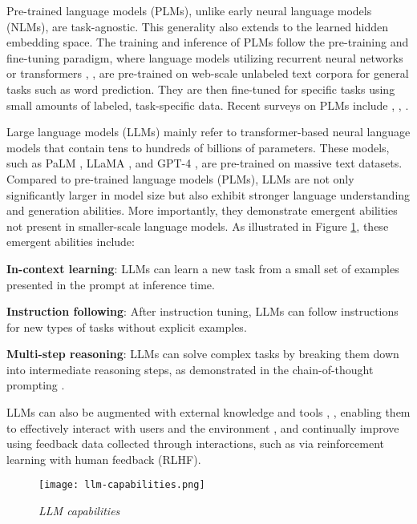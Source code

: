 Pre-trained language models (PLMs), unlike early neural language models (NLMs), are task-agnostic. This generality also extends to the learned hidden embedding space. The training and inference of PLMs follow the pre-training and fine-tuning paradigm, where language models utilizing recurrent neural networks \cite{peters2018deep} or transformers \cite{devlin2019bert}, \cite{liu2019roberta}, \cite{he2021deberta} are pre-trained on web-scale unlabeled text corpora for general tasks such as word prediction. They are then fine-tuned for specific tasks using small amounts of labeled, task-specific data. Recent surveys on PLMs include \cite{zhou2023comprehensive}, \cite{han2021pretrained}, \cite{Qiu_2020}.

Large language models (LLMs) mainly refer to transformer-based neural language models that contain tens to hundreds of billions of parameters. These models, such as PaLM \cite{chowdhery2022palm}, LLaMA \cite{touvron2023llama}, and GPT-4 \cite{openai2024gpt4}, are pre-trained on massive text datasets. Compared to pre-trained language models (PLMs), LLMs are not only significantly larger in model size but also exhibit stronger language understanding and generation abilities. More importantly, they demonstrate emergent abilities not present in smaller-scale language models. As illustrated in Figure \ref{fig:llm-capabilities}, these emergent abilities include:

\textbf{In-context learning}: LLMs can learn a new task from a small set of examples presented in the prompt at inference time.

\textbf{Instruction following}: After instruction tuning, LLMs can follow instructions for new types of tasks without explicit examples.

\textbf{Multi-step reasoning}: LLMs can solve complex tasks by breaking them down into intermediate reasoning steps, as demonstrated in the chain-of-thought prompting \cite{wei2023chainofthought}.

LLMs can also be augmented with external knowledge and tools \cite{mialon2023augmented}, \cite{mialon2023augmented}, enabling them to effectively interact with users and the environment \cite{mialon2023augmented}, and continually improve using feedback data collected through interactions, such as via reinforcement learning with human feedback (RLHF).

\begin{figure}[H]
    \centering
    \texttt{[image: llm-capabilities.png]}
    \caption{
        \it{LLM capabilities \cite{minaee2024large}}
    }
    \label{fig:llm-capabilities}
\end{figure}

